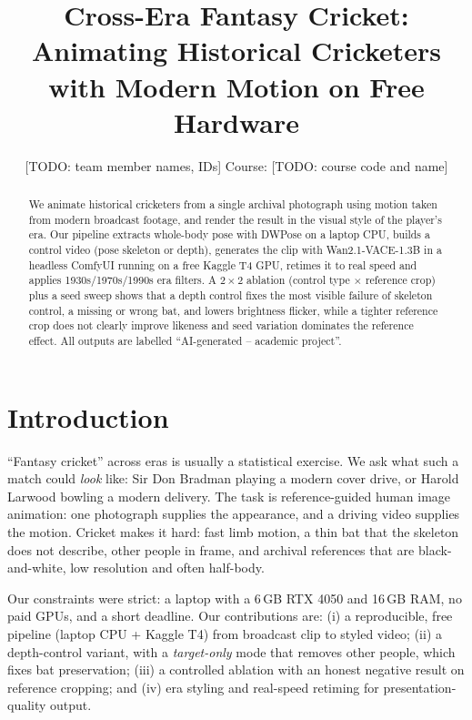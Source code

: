 \documentclass[10pt,twocolumn]{article}
\title{\vspace{-1.5em}Cross-Era Fantasy Cricket: Animating Historical Cricketers\\with Modern Motion on Free Hardware\vspace{-0.5em}}
\author{[TODO: team member names, IDs] \quad Course: [TODO: course code and name]}
\date{\vspace{-1.5em}}
\begin{document}
\maketitle

\begin{abstract}
We animate historical cricketers from a single archival photograph using motion taken from modern broadcast footage, and
render the result in the visual style of the player's era. Our pipeline extracts whole-body pose with DWPose on a laptop
CPU, builds a control video (pose skeleton or depth), generates the clip with Wan2.1-VACE-1.3B in a headless ComfyUI
running on a free Kaggle T4 GPU, retimes it to real speed and applies 1930s/1970s/1990s era filters. A $2{\times}2$
ablation (control type $\times$ reference crop) plus a seed sweep shows that a depth control fixes the most visible
failure of skeleton control, a missing or wrong bat, and lowers brightness flicker, while a tighter reference crop does
not clearly improve likeness and seed variation dominates the reference effect. All outputs are labelled
``AI-generated -- academic project''.
\end{abstract}

\section{Introduction}
``Fantasy cricket'' across eras is usually a statistical exercise. We ask what such a match could \emph{look} like: Sir Don
Bradman playing a modern cover drive, or Harold Larwood bowling a modern delivery. The task is reference-guided human
image animation: one photograph supplies the appearance, and a driving video supplies the motion. Cricket makes it hard:
fast limb motion, a thin bat that the skeleton does not describe, other people in frame, and archival references that are
black-and-white, low resolution and often half-body.

Our constraints were strict: a laptop with a 6\,GB RTX 4050 and 16\,GB RAM, no paid GPUs, and a short deadline. Our
contributions are: (i) a reproducible, free pipeline (laptop CPU + Kaggle T4) from broadcast clip to styled video;
(ii) a depth-control variant, with a \emph{target-only} mode that removes other people, which fixes bat
preservation; (iii) a controlled ablation with an honest negative result on reference cropping; and (iv) era styling
and real-speed retiming for presentation-quality output.
\end{document}
